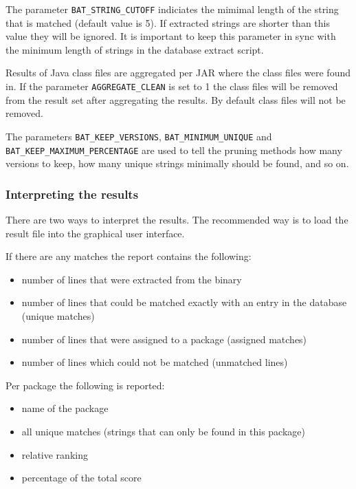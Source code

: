 \documentclass[10pt,a4paper]{article}
\begin{document}
The parameter \texttt{BAT\_STRING\_CUTOFF} indiciates the mimimal length of the
string that is matched (default value is 5). If extracted strings are shorter
than this value they will be ignored. It is important to keep this parameter in
sync with the minimum length of strings in the database extract script.

Results of Java class files are aggregated per JAR where the class files were
found in. If the parameter \texttt{AGGREGATE\_CLEAN} is set to 1 the class
files will be removed from the result set after aggregating the results. By
default class files will not be removed.

The parameters \texttt{BAT\_KEEP\_VERSIONS}, \texttt{BAT\_MINIMUM\_UNIQUE} and
\texttt{BAT\_KEEP\_MAXIMUM\_PERCENTAGE} are used to tell the pruning methods
how many versions to keep, how many unique strings minimally should be found,
and so on.

\subsubsection{Interpreting the results}

There are two ways to interpret the results. The recommended way is to load the
result file into the graphical user interface.

If there are any matches the report contains the following:

\begin{itemize}
\item number of lines that were extracted from the binary
\item number of lines that could be matched exactly with an entry in the
database (unique matches)
\item number of lines that were assigned to a package (assigned matches)
\item number of lines which could not be matched (unmatched lines)
\end{itemize}

Per package the following is reported:

\begin{itemize}
\item name of the package
\item all unique matches (strings that can only be found in this package)
\item relative ranking
\item percentage of the total score
\end{itemize}
\end{document}
